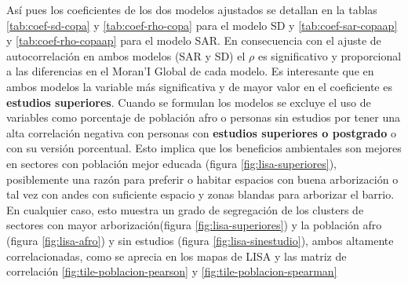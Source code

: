 \documentclass[12pt,]{book}
\begin{document}
Así pues los coeficientes de los dos modelos ajustados se detallan en la
tablas \ref{tab:coef-sd-copa} y \ref{tab:coef-rho-copa} para el modelo
SD y \ref{tab:coef-sar-copaap} y \ref{tab:coef-rho-copaap} para el
modelo SAR. En consecuencia con el ajuste de autocorrelación en ambos
modelos (SAR y SD) el \(\rho\) es significativo y proporcional a las
diferencias en el Moran'I Global de cada modelo. Es interesante que en
ambos modelos la variable más significativa y de mayor valor en el
coeficiente es \textbf{estudios superiores}. Cuando se formulan los
modelos se excluye el uso de variables como porcentaje de población afro
o personas sin estudios por tener una alta correlación negativa con
personas con \textbf{estudios superiores o postgrado} o con su versión
porcentual. Esto implica que los beneficios ambientales son mejores en
sectores con población mejor educada (figura \ref{fig:lisa-superiores}),
posiblemente una razón para preferir o habitar espacios con buena
arborización o tal vez con andes con suficiente espacio y zonas blandas
para arborizar el barrio. En cualquier caso, esto muestra un grado de
segregación de los clusters de sectores con mayor arborización(figura
\ref{fig:lisa-superiores}) y la población afro (figura
\ref{fig:lisa-afro}) y sin estudios (figura \ref{fig:lisa-sinestudio}),
ambos altamente correlacionadas, como se aprecia en los mapas de LISA y
las matriz de correlación \ref{fig:tile-poblacion-pearson} y
\ref{fig:tile-poblacion-spearman}
\end{document}

